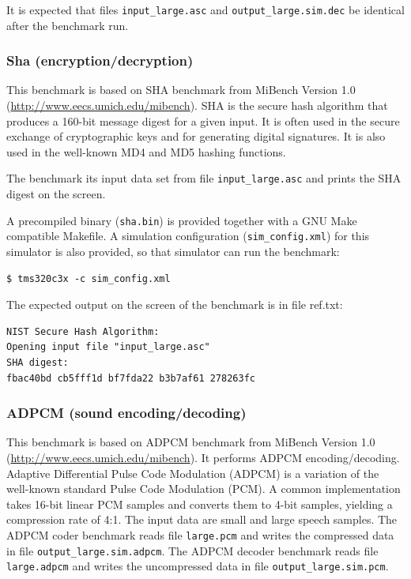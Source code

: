 It is expected that files \texttt{input\_large.asc} and \texttt{output\_large.sim.dec} be identical after the benchmark run.

\subsubsection{Sha (encryption/decryption)}

This benchmark is based on SHA benchmark from MiBench Version 1.0 (\url{http://www.eecs.umich.edu/mibench}).
SHA is the secure hash algorithm that produces a 160-bit message digest for a given input. It is often
used in the secure exchange of cryptographic keys and for generating digital signatures. It is also used in the
well-known MD4 and MD5 hashing functions.

The benchmark its input data set from file \texttt{input\_large.asc} and prints the SHA digest on the screen.

A precompiled binary (\texttt{sha.bin}) is provided together with a GNU Make compatible Makefile.
A simulation configuration (\texttt{sim\_config.xml}) for this simulator is also provided, so that simulator can run the benchmark:

\begin{verbatim}
$ tms320c3x -c sim_config.xml
\end{verbatim}

The expected output on the screen of the benchmark is in file ref.txt:

\begin{verbatim}
NIST Secure Hash Algorithm:
Opening input file "input_large.asc"
SHA digest:
fbac40bd cb5fff1d bf7fda22 b3b7af61 278263fc
\end{verbatim}

\subsubsection{ADPCM (sound encoding/decoding)}

This benchmark is based on ADPCM benchmark from MiBench Version 1.0 (\url{http://www.eecs.umich.edu/mibench}).
It performs ADPCM encoding/decoding. Adaptive Differential Pulse Code Modulation (ADPCM) is a variation
of the well-known standard Pulse Code Modulation (PCM). A common implementation takes 16-bit linear
PCM samples and converts them to 4-bit samples, yielding a compression rate of 4:1. The input data are
small and large speech samples.
The ADPCM coder benchmark reads file \texttt{large.pcm} and writes the compressed data in file \texttt{output\_large.sim.adpcm}.
The ADPCM decoder benchmark reads file \texttt{large.adpcm} and writes the uncompressed data in file \texttt{output\_large.sim.pcm}.

